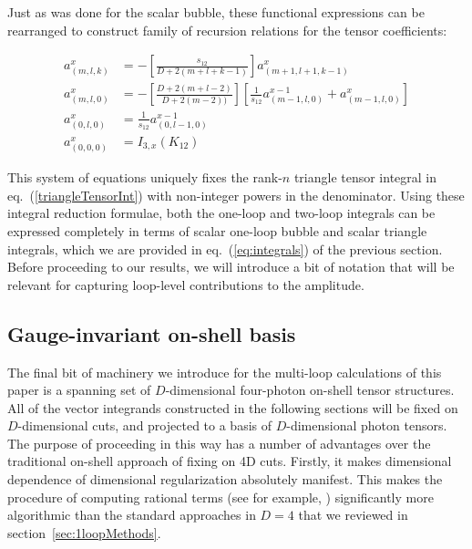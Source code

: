 \documentclass[11pt,letter]{article}
\def\sect#1{section~\ref{#1}}
\def\eqn#1{eq.~(\ref{#1})}
\begin{document}
Just as was done for the scalar bubble, these functional expressions can be rearranged to construct family of recursion relations for the tensor coefficients:
\begin{eBox}
\begin{equation}\label{eq:triRed}
\begin{aligned}
a_{(m,l,k)}^x&=-\left[\frac{s_{12}}{D+2(m+l+k-1)}\right]a_{(m+1,l+1,k-1)}^x
\\
a_{(m,l,0)}^x&=-\left[\frac{D+2(m+l-2)}{D+2(m-2))}\right]\left[\frac{1}{s_{12}} a^{x-1}_{(m-1,l,0)}+a^{x}_{(m-1,l,0)}\right]
\\
a^x_{(0,l,0)}&= \frac{1}{s_{12}} a_{(0,l-1,0)}^{x-1} 
\\
a^x_{(0,0,0)} &= I_{3,x}(K_{12})
\end{aligned}
\end{equation}
\end{eBox}
This system of equations uniquely fixes the rank-$n$ triangle tensor integral in \eqn{triangleTensorInt} with non-integer powers in the denominator. Using these integral reduction formulae, both the one-loop and two-loop integrals can be expressed completely in terms of scalar one-loop bubble and scalar triangle integrals, which we are provided in \eqn{eq:integrals} of the previous section. Before proceeding to our results, we will introduce a bit of notation that will be relevant for capturing loop-level contributions to the amplitude. 

\subsection{Gauge-invariant on-shell basis}\label{sec:basisT}
The final bit of machinery we introduce for the multi-loop calculations of this paper is a spanning set of $D$-dimensional four-photon on-shell tensor structures. All of the vector integrands constructed in the following sections will be fixed on $D$-dimensional cuts, and projected to a basis of $D$-dimensional photon tensors. The purpose of proceeding in this way has a number of advantages over the traditional on-shell approach of fixing on 4D cuts. Firstly, it makes dimensional dependence of dimensional regularization absolutely manifest. This makes the procedure of computing rational terms (see for example, \cite{Badger:2008cm}) significantly more algorithmic than the standard approaches in $D=4$ that we reviewed in \sect{sec:1loopMethods}. 
\end{document}
